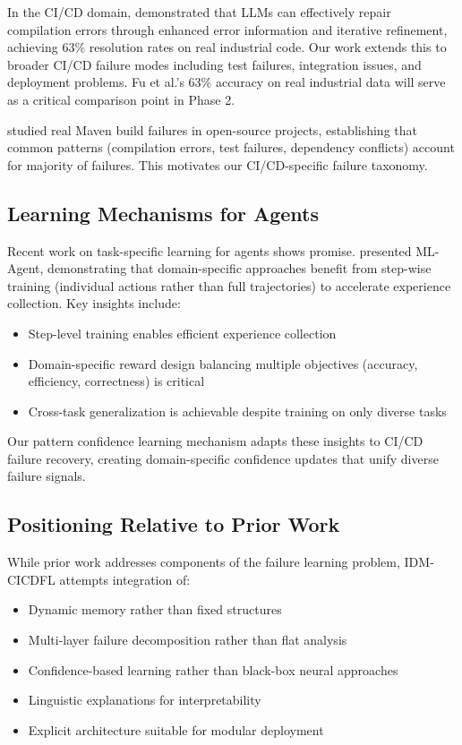 \documentclass[11pt]{article}
\begin{document}
In the CI/CD domain, \citet{Fu2025} demonstrated that LLMs can effectively repair compilation errors through enhanced error information and iterative refinement, achieving 63\% resolution rates on real industrial code. Our work extends this to broader CI/CD failure modes including test failures, integration issues, and deployment problems. Fu et al.'s 63\% accuracy on real industrial data will serve as a critical comparison point in Phase 2.

\citet{Vasallo2019} studied real Maven build failures in open-source projects, establishing that common patterns (compilation errors, test failures, dependency conflicts) account for majority of failures. This motivates our CI/CD-specific failure taxonomy.

\subsection{Learning Mechanisms for Agents}

Recent work on task-specific learning for agents shows promise. \citet{Liu2025} presented ML-Agent, demonstrating that domain-specific approaches benefit from step-wise training (individual actions rather than full trajectories) to accelerate experience collection. Key insights include:

\begin{itemize}
    \item Step-level training enables efficient experience collection
    \item Domain-specific reward design balancing multiple objectives (accuracy, efficiency, correctness) is critical
    \item Cross-task generalization is achievable despite training on only diverse tasks
\end{itemize}

Our pattern confidence learning mechanism adapts these insights to CI/CD failure recovery, creating domain-specific confidence updates that unify diverse failure signals.

\subsection{Positioning Relative to Prior Work}

While prior work addresses components of the failure learning problem, IDM-CICDFL attempts integration of:

\begin{itemize}
    \item Dynamic memory rather than fixed structures
    \item Multi-layer failure decomposition rather than flat analysis
    \item Confidence-based learning rather than black-box neural approaches
    \item Linguistic explanations for interpretability
    \item Explicit architecture suitable for modular deployment
\end{itemize}
\end{document}
